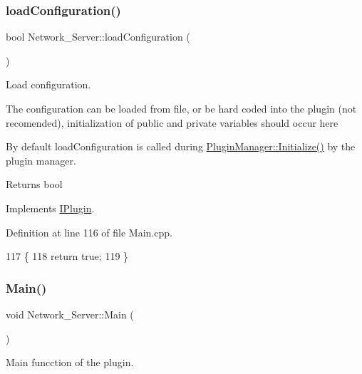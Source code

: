 \subsubsection{\texorpdfstring{load\+Configuration()}{loadConfiguration()}}
{\footnotesize\ttfamily bool Network\+\_\+\+Server\+::load\+Configuration (\begin{DoxyParamCaption}{ }\end{DoxyParamCaption})\hspace{0.3cm}{\ttfamily [virtual]}}



Load configuration. 

The configuration can be loaded from file, or be hard coded into the plugin (not recomended), initialization of public and private variables should occur here

By default load\+Configuration is called during \hyperlink{class_plugin_manager_a956e653b7db36da9d034b4a93c8308d5}{Plugin\+Manager\+::\+Initialize()} by the plugin manager.

\begin{DoxyReturn}{Returns}
bool 
\end{DoxyReturn}


Implements \hyperlink{class_i_plugin_a418cff309436d3a15d9a4ce7369db6dd}{I\+Plugin}.



Definition at line 116 of file Main.\+cpp.


\begin{DoxyCode}
117 \{
118     \textcolor{keywordflow}{return} \textcolor{keyword}{true};
119 \}
\end{DoxyCode}
\mbox{\label{class_network___server_aa9d6cd53b5c62355518ad0a32ba1444b}} 
\subsubsection{\texorpdfstring{Main()}{Main()}}
{\footnotesize\ttfamily void Network\+\_\+\+Server\+::\+Main (\begin{DoxyParamCaption}{ }\end{DoxyParamCaption})\hspace{0.3cm}{\ttfamily [virtual]}}



Main funcction of the plugin. 

